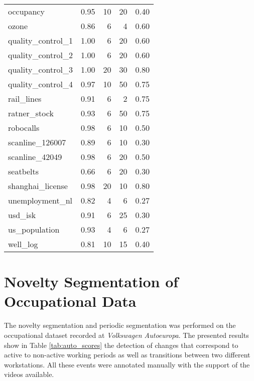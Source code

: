 \begin{table}[H]
\begin{tabular}{lrrrr}
    occupancy &  0.95 &   10 &   20 &  0.40 \\
    ozone &  0.86 &    6 &    4 &  0.60 \\
    quality\_control\_1 &  1.00 &    6 &   20 &  0.60 \\
    quality\_control\_2 &  1.00 &    6 &   20 &  0.60 \\
    quality\_control\_3 &  1.00 &   20 &   30 &  0.80 \\
    quality\_control\_4 &  0.97 &   10 &   50 &  0.75 \\
    rail\_lines &  0.91 &    6 &    2 &  0.75 \\
    ratner\_stock &  0.93 &    6 &   50 &  0.75 \\
    robocalls &  0.98 &    6 &   10 &  0.50 \\
    scanline\_126007 &  0.89 &    6 &   10 &  0.30 \\
    scanline\_42049 &  0.98 &    6 &   20 &  0.50 \\
    seatbelts &  0.66 &    6 &   20 &  0.30 \\
    shanghai\_license &  0.98 &   20 &   10 &  0.80 \\
    unemployment\_nl &  0.82 &    4 &    6 &  0.27 \\
    usd\_isk &  0.91 &    6 &   25 &  0.30 \\
    us\_population &  0.93 &    4 &    6 &  0.27 \\
    well\_log &  0.81 &   10 &   15 &  0.40 \\
    \bottomrule
    \end{tabular}
\end{table}

\section{Novelty Segmentation of Occupational Data}
\label{append:novelty_occupational}

The novelty segmentation and periodic segmentation was performed on the occupational dataset recorded at \textit{Volkswagen Autoeuropa}. The presented results show in Table \ref{tab:auto_scores} the detection of changes that correspond to active to non-active working periods as well as transitions between two different workstations. All these events were annotated manually with the support of the videos available. 

